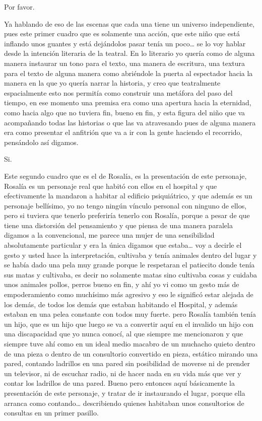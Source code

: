 Por favor.

Ya hablando de eso de las escenas que cada una tiene un universo independiente, pues este primer cuadro que es solamente una acción, que este niño que está inflando unos guantes y está dejándolos pasar tenía un poco… se lo voy hablar desde la intención literaria de la teatral.
En lo literario yo quería como de alguna manera instaurar un tono para el texto, una manera de escritura, una textura para el texto de alguna manera como abriéndole la puerta al espectador hacia la manera en la que yo quería narrar la  historia, y creo que teatralmente espacialmente esto nos permitía como construir una metáfora del paso del tiempo, en ese momento una premisa era como una apertura hacia la eternidad, como hacia algo que no tuviera fin, bueno en fin, y esta figura del niño que va acompañando todas las historias o que las va atravesando pues de alguna manera era como presentar el anfitrión que va a ir con la gente haciendo el recorrido, pensándolo así digamos.

Si.

Este segundo cuadro que es el de Rosalía, es la presentación de este personaje, Rosalía es un personaje real que habitó con ellos en el hospital y que efectivamente la mandaron a habitar al edificio psiquiátrico, y que además es un personaje bellísimo, yo no tengo ningún vínculo personal con ninguno de ellos, pero si tuviera que tenerlo preferiría tenerlo con Rosalía, porque a pesar de que tiene una distorsión del pensamiento y que piensa de una manera paralela digamos a la convencional, me parece una mujer de una sensibilidad absolutamente particular y era la única digamos que estaba… voy a decirle el gesto y usted hace la interpretación, cultivaba y tenía animales dentro del lugar y se había dado una pela muy grande porque le respetaran el patiecito donde tenía sus matas y cultivaba, es decir no solamente matas sino cultivaba cosas y cuidaba unos animales pollos, perros bueno en fin, y ahí yo vi como un gesto más de empoderamiento como muchísimo más agresivo y eso le significó estar alejada de  los demás, de todos los demás que estaban habitando el Hospital, y además estaban en una pelea constante con todos muy fuerte. pero Rosalía también tenía un hijo, que es un hijo que luego se va a convertir aquí en el invalido un hijo con una discapacidad que yo nunca conocí, al que siempre me mencionaron y que siempre tuve ahí como en un ideal medio macabro de un muchacho quieto dentro de una pieza o dentro de un consultorio convertido en pieza, estático mirando una pared, contando ladrillos en una pared sin posibilidad de moverse ni de prender un televisor, ni de escuchar radio, ni de hacer nada en su vida más que ver y contar los ladrillos de una pared.
Bueno pero entonces aquí básicamente la presentación de este personaje, y tratar de ir instaurando el lugar, porque ella arranca como contando… describiendo quienes habitaban unos consultorios de consultas en un primer pasillo.

